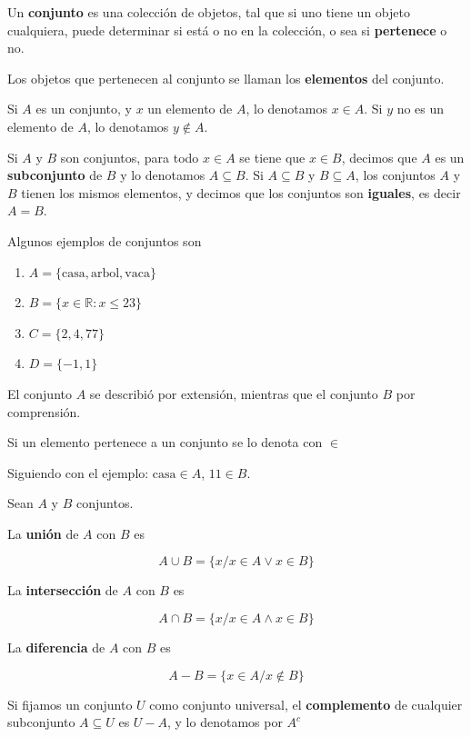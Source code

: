 \begin{definition}[Conjunto] 
Un \textbf{conjunto} \label{conjunto} es una colección de objetos, tal que si uno tiene un objeto cualquiera, puede determinar si está o no en la colección, o sea si \textbf{pertenece} o no.

Los objetos que pertenecen al conjunto se llaman los \textbf{elementos} del conjunto.

Si $A$ es un conjunto, y $x$ un elemento de $A$, lo denotamos $x \in A$.  Si $y$ no es un elemento de $A$, lo denotamos $y \not\in A$.

Si $A$ y $B$ son conjuntos, para todo $x \in A$ se tiene que $x \in B$, decimos que $A$ es un \textbf{subconjunto} de $B$  y lo denotamos $A \subseteq B$.  Si $A \subseteq B$ y $B \subseteq A$, los conjuntos $A$ y $B$ tienen los mismos elementos, y decimos que los conjuntos son \textbf{iguales}, es decir $A = B$.
\end{definition}

\begin{example}  
Algunos ejemplos de conjuntos son

\begin{enumerate} 
\item $ A = \{ \textrm{casa}, \textrm{arbol}, \textrm{vaca} \} $
\item $ B = \{ x \in \mathbb{R} : x \leq 23 \} $
\item $ C = \{ 2 , 4 , 77 \}$
\item $ D = \{-1, 1\} $
\end{enumerate}

El conjunto $A$ se describió por extensión, mientras que el conjunto $B$ por comprensión.

Si un elemento pertenece a un conjunto se lo denota con $\in$

Siguiendo con el ejemplo: $ \textrm{casa} \in A $, $ 11 \in B$.
\end{example}

\begin{definition} 
Sean $A$ y $B$ conjuntos.  

La \textbf{unión}  de $A$ con $B$ es

$$A \cup B = \{ x / x \in A \vee x \in B \}$$

La \textbf{intersección}  de $A$ con $B$ es

$$A \cap B = \{ x / x \in A \wedge x \in B \}$$

La \textbf{diferencia}  de $A$ con $B$ es

$$A - B = \{ x \in A / x \not\in B\}$$

Si fijamos un conjunto $U$ como conjunto universal, el \textbf{complemento}  de cualquier subconjunto $A \subseteq U$ es $U-A$, y lo denotamos por $A^c$
\end{definition}


